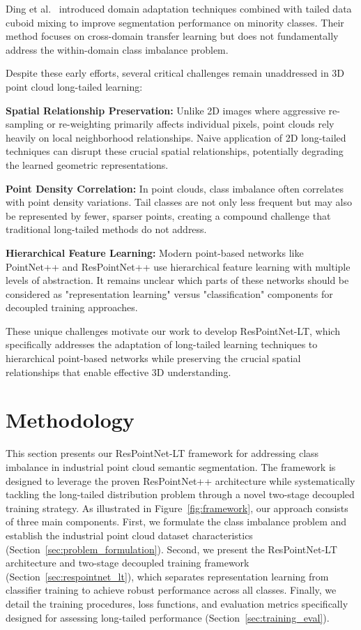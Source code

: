 \documentclass[preprint,12pt]{elsarticle}
\begin{document}
Ding et al.~\cite{ding2022domain} introduced domain adaptation techniques combined with tailed data cuboid mixing to improve segmentation performance on minority classes. Their method focuses on cross-domain transfer learning but does not fundamentally address the within-domain class imbalance problem.

Despite these early efforts, several critical challenges remain unaddressed in 3D point cloud long-tailed learning:

\textbf{Spatial Relationship Preservation:} Unlike 2D images where aggressive re-sampling or re-weighting primarily affects individual pixels, point clouds rely heavily on local neighborhood relationships. Naive application of 2D long-tailed techniques can disrupt these crucial spatial relationships, potentially degrading the learned geometric representations.

\textbf{Point Density Correlation:} In point clouds, class imbalance often correlates with point density variations. Tail classes are not only less frequent but may also be represented by fewer, sparser points, creating a compound challenge that traditional long-tailed methods do not address.

\textbf{Hierarchical Feature Learning:} Modern point-based networks like PointNet++ and ResPointNet++ use hierarchical feature learning with multiple levels of abstraction. It remains unclear which parts of these networks should be considered as "representation learning" versus "classification" components for decoupled training approaches.

These unique challenges motivate our work to develop ResPointNet-LT, which specifically addresses the adaptation of long-tailed learning techniques to hierarchical point-based networks while preserving the crucial spatial relationships that enable effective 3D understanding.



\section{Methodology}
\label{sec:methodology}
This section presents our ResPointNet-LT framework for addressing class imbalance in industrial point cloud semantic segmentation. The framework is designed to leverage the proven ResPointNet++ architecture while systematically tackling the long-tailed distribution problem through a novel two-stage decoupled training strategy. As illustrated in Figure~\ref{fig:framework}, our approach consists of three main components. First, we formulate the class imbalance problem and establish the industrial point cloud dataset characteristics (Section~\ref{sec:problem_formulation}). Second, we present the ResPointNet-LT architecture and two-stage decoupled training framework (Section~\ref{sec:respointnet_lt}), which separates representation learning from classifier training to achieve robust performance across all classes. Finally, we detail the training procedures, loss functions, and evaluation metrics specifically designed for assessing long-tailed performance (Section~\ref{sec:training_eval}).
\end{document}
